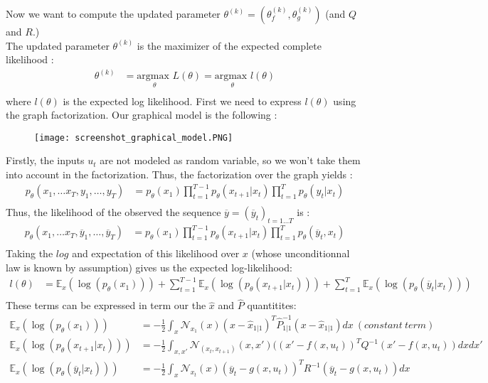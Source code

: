 Now we want to compute the updated parameter $\theta^{(k)} = (\theta_f^{(k)}, \theta_g^{(k)})$ (and $Q$ and $R$.)\\ 

The updated parameter $\theta^{(k)}$ is the maximizer of the expected complete likelihood :
\begin{align*}
  \theta^{(k)} &= \underset{\theta}{\text{argmax }}L(\theta) = \underset{\theta}{\text{argmax }}l(\theta)\\
\end{align*}
where $l(\theta)$ is the expected log likelihood.
First we need to express $l(\theta)$ using the graph factorization.
Our graphical model is the following :
\begin{figure}[H]
	\texttt{[image: screenshot\_graphical\_model.PNG]}
\end{figure}
Firstly, the inputs $u_t$ are not modeled as random variable, so we won't take them into account in the factorization.
Thus, the factorization over the graph yields :
\begin{align*}
p_{\theta}(x_1, \ldots x_T, y_1, \ldots , y_T) &= p_{\theta}(x_1) \prod_{t=1}^{T-1}{p_{\theta}(x_{t+1}|x_t)} \prod_{t=1}^{T}{p_{\theta}(y_t|x_t)}\\
\end{align*}
Thus, the likelihood of the observed the sequence $\overline{y} = (\overline{y}_t)_{t=1 \ldots T}$ is :
\begin{align*}
  p_{\theta}(x_1, \ldots x_T, \overline{y}_1, \ldots , \overline{y}_T) &= p_{\theta}(x_1) \prod_{t=1}^{T-1}{p_{\theta}(x_{t+1}| x_t)} \prod_{t=1}^{T}{p_{\theta}(\overline{y}_t, x_t)}\\
\end{align*}
Taking the $log$ and expectation of this likelihood over $x$ (whose unconditionnal law is known by assumption) gives us the expected log-likelihood:
\begin{align*}
  l(\theta) & =
    \mathbb{E}_x(\log(p_{\theta}(x_1))) +
    \sum_{t=1}^{T-1}{\mathbb{E}_x \left( \log(p_{\theta}(x_{t+1}|x_t)) \right)} +
    \sum_{t=1}^{T}{\mathbb{E}_x\left( \log(p_{\theta}(\overline{y}_t|x_t)) \right)}\nonumber \\
\end{align*}
These terms can be expressed in term our the $\hat{x}$ and $\hat{P}$ quantitites:
\begin{align*}
  \mathbb{E}_x(\log(p_{\theta}(x_1))) &= -\frac{1}{2}\int_x{\mathcal{N}_{x_1}(x) (x - \hat{x}_{1|1})^T \hat{P}_{1|1}^{-1} (x - \hat{x}_{1|1}) dx}\ (constant \  term)\\
  \mathbb{E}_x \left( \log(p_{\theta}(x_{t+1}|x_t)) \right) &= -\frac{1}{2}\int_{x,x'}{\mathcal{N}_{(x_t,x_{t+1})}(x, x') ((x' - f(x,u_t))^T Q^{-1} (x' - f(x,u_t)) dxdx'}\\
  \mathbb{E}_x\left( \log(p_{\theta}(\overline{y}_t|x_t)) \right) &= -\frac{1}{2}\int_x{\mathcal{N}_{x_t}(x) (\overline{y}_t - g(x, u_t))^T R^{-1} (\overline{y}_t - g(x, u_t)) dx}\\
\end{align*}
